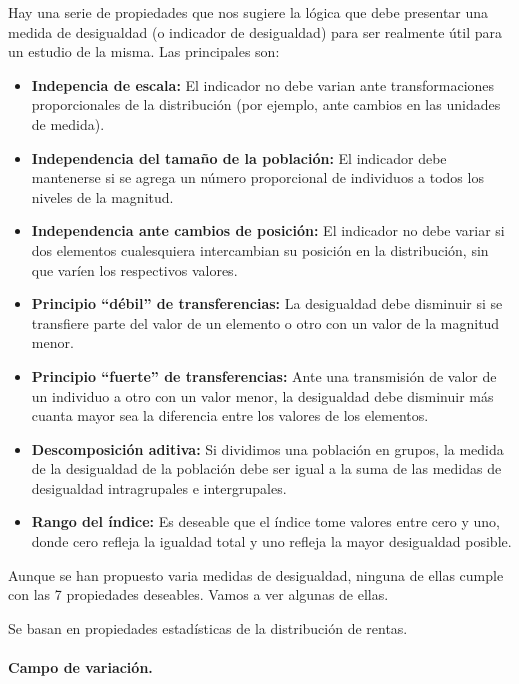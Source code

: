 Hay una serie de propiedades que nos sugiere la l\'ogica que debe presentar una medida de desigualdad (o indicador de desigualdad) para ser realmente \'util para un estudio de la misma. Las principales son:
\begin{itemize}
\item \textbf{Indepencia de escala:} El indicador no debe varian ante transformaciones proporcionales de la distribuci\'on (por ejemplo, ante cambios en las unidades de medida).
\item \textbf{Independencia del tama\~no de la poblaci\'on:} El indicador debe mantenerse si se agrega un n\'umero proporcional de individuos a todos los niveles de la magnitud.
\item \textbf{Independencia ante cambios de posici\'on:} El indicador no debe variar si dos elementos cualesquiera intercambian su posici\'on en la distribuci\'on, sin que var\'ien los respectivos valores.
\item \textbf{Principio ``d\'ebil'' de transferencias:} La desigualdad debe disminuir si se transfiere parte del valor de un elemento o otro con un valor de la magnitud menor.
\item \textbf{Principio ``fuerte'' de transferencias:} Ante una transmisi\'on de valor de un individuo a otro con un valor menor, la desigualdad debe disminuir m\'as cuanta mayor sea la diferencia entre los valores de los elementos.
\item \textbf{Descomposici\'on aditiva:} Si dividimos una poblaci\'on en grupos, la medida de la desigualdad de la poblaci\'on debe ser igual a la suma de las medidas de desigualdad intragrupales e intergrupales.
\item \textbf{Rango del \'indice:} Es deseable que el \'indice tome valores entre cero y uno, donde cero refleja la igualdad total y uno refleja la mayor desigualdad posible.
\end{itemize}

Aunque se han propuesto varia medidas de desigualdad, ninguna de ellas cumple con las 7 propiedades deseables. Vamos a ver algunas de ellas.


Se basan en propiedades estad\'isticas de la distribuci\'on de rentas.

\paragraph{Campo de variaci\'on.}

